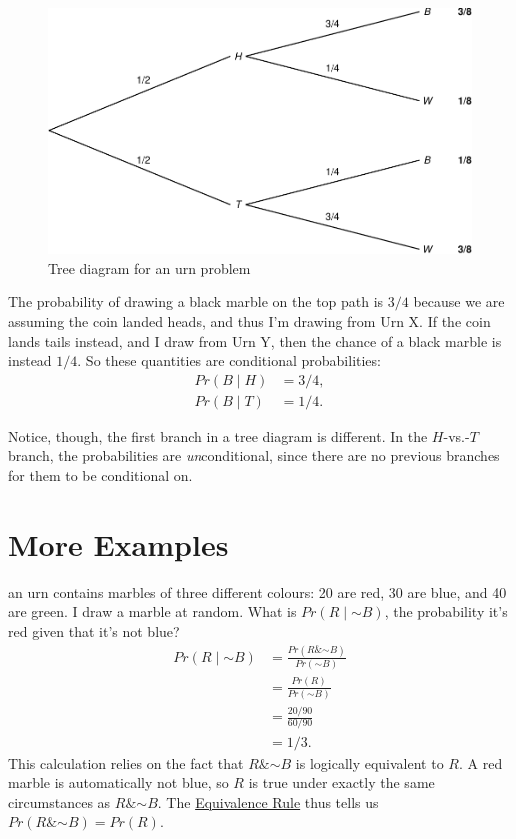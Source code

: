 \documentclass[justified]{tufte-book}
\newcommand{\given}{\mid}
\renewcommand{\neg}{\mathbin{\sim}}
\renewcommand{\wedge}{\mathbin{\&}}
\newcommand{\p}{Pr}
\theoremstyle{definition}
\theoremstyle{definition}
\theoremstyle{definition}
\theoremstyle{remark}
\begin{document}
\begin{figure}
\includegraphics{_main_files/figure-latex/unnamed-chunk-63-1} \caption[Tree diagram for an urn problem]{Tree diagram for an urn problem}\label{fig:unnamed-chunk-63}
\end{figure}

The probability of drawing a black marble on the top path is \(3/4\) because we are assuming the coin landed heads, and thus I'm drawing from Urn X. If the coin lands tails instead, and I draw from Urn Y, then the chance of a black marble is instead \(1/4\). So these quantities are conditional probabilities:
\[
  \begin{aligned}
    \p(B \given H) &= 3/4,\\
    \p(B \given T) &= 1/4.
  \end{aligned}
\]

Notice, though, the first branch in a tree diagram is different. In the \(H\)-vs.-\(T\) branch, the probabilities are \emph{un}conditional, since there are no previous branches for them to be conditional on.

\hypertarget{more-examples}{%
\section{More Examples}\label{more-examples}}

 an urn contains marbles of three different colours: 20 are red, 30 are blue, and 40 are green. I draw a marble at random. What is \(\p(R \given \neg B)\), the probability it's red given that it's not blue?
\[
  \begin{aligned}
    \p(R \given \neg B) &= \frac{\p(R \wedge \neg B)}{\p(\neg B)}\\
                        &= \frac{\p(R)}{\p(\neg B)}\\
                        &= \frac{20/90}{60/90}\\
                        &= 1/3.
  \end{aligned}
\]
This calculation relies on the fact that \(R \wedge \neg B\) is logically equivalent to \(R\). A red marble is automatically not blue, so \(R\) is true under exactly the same circumstances as \(R \wedge \neg B\). The \protect\hyperlink{tautologies-contradictions-and-equivalent-propositions}{Equivalence Rule} thus tells us \(\p(R \wedge \neg B) = \p(R)\).
\end{document}
